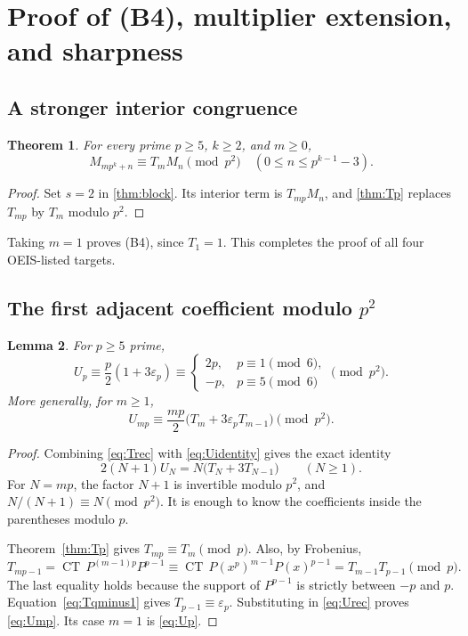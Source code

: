 \documentclass[11pt,a4paper]{article}
\numberwithin{equation}{section}
\newtheorem{theorem}{Theorem}[section]
\newtheorem{lemma}[theorem]{Lemma}
\theoremstyle{definition}
\theoremstyle{remark}
\DeclareMathOperator{\CT}{CT}
\newcommand{\eps}{\varepsilon}
\begin{document}
\section{Proof of (B4), multiplier extension, and sharpness}\label{sec:B4}

\subsection{A stronger interior congruence}
\begin{theorem}\label{thm:multiplier}
For every prime $p\geq5$, $k\geq2$, and $m\geq0$,
\begin{equation}\label{eq:multiplier}
 \boxed{\quad M_{mp^k+n}\equiv T_mM_n\pmod{p^2}
 \quad(0\leq n\leq p^{k-1}-3).\quad}
\end{equation}
\end{theorem}
\begin{proof}
Set $s=2$ in \cref{thm:block}. Its interior term is
$T_{mp}M_n$, and \cref{thm:Tp} replaces $T_{mp}$ by $T_m$ modulo
$p^2$.
\end{proof}
Taking $m=1$ proves (B4), since $T_1=1$. This completes the proof of
all four OEIS-listed targets.

\subsection{The first adjacent coefficient modulo \texorpdfstring{$p^2$}{p squared}}
\begin{lemma}\label{lem:Up}
For $p\geq5$ prime,
\begin{equation}\label{eq:Up}
 U_p\equiv\frac p2(1+3\eps_p)\equiv
 \begin{cases}2p,&p\equiv1\pmod6,\\-p,&p\equiv5\pmod6\end{cases}
 \pmod{p^2}.
\end{equation}
More generally, for $m\geq1$,
\begin{equation}\label{eq:Ump}
 U_{mp}\equiv\frac{mp}{2}
            \bigl(T_m+3\eps_pT_{m-1}\bigr)\pmod{p^2}.
\end{equation}
\end{lemma}
\begin{proof}
Combining \eqref{eq:Trec} with \eqref{eq:Uidentity} gives the exact
identity
\begin{equation}\label{eq:Urec}
 2(N+1)U_N=N\bigl(T_N+3T_{N-1}\bigr)\qquad(N\geq1).
\end{equation}
For $N=mp$, the factor $N+1$ is invertible modulo $p^2$, and
$N/(N+1)\equiv N\pmod{p^2}$. It is enough to know the coefficients
inside the parentheses modulo $p$.

Theorem~\ref{thm:Tp} gives $T_{mp}\equiv T_m\pmod p$. Also,
by Frobenius,
\[
 T_{mp-1}=\CT\,P^{(m-1)p}P^{p-1}
 \equiv\CT\,P(x^p)^{m-1}P(x)^{p-1}
 =T_{m-1}T_{p-1}\pmod p.
\]
The last equality holds because the support of $P^{p-1}$ is strictly
between $-p$ and $p$. Equation~\eqref{eq:Tqminus1} gives
$T_{p-1}\equiv\eps_p$. Substituting in \eqref{eq:Urec} proves
\eqref{eq:Ump}. Its case $m=1$ is \eqref{eq:Up}.
\end{proof}
\end{document}
